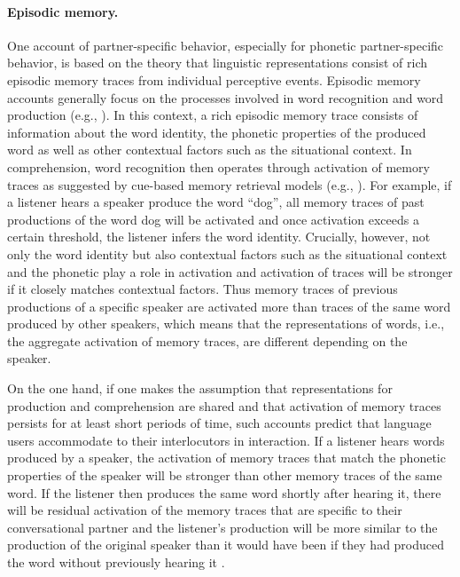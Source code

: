 \paragraph{Episodic memory.} One account of partner-specific behavior, especially for phonetic partner-specific behavior, is based
on the theory that linguistic representations consist of rich episodic memory traces from individual perceptive events. Episodic memory
accounts generally focus on the processes involved in word recognition and word production (e.g., \cite{Goldinger1998,Johnson1996,Pierrehumbert2001}).
In this context, a rich episodic memory trace consists of information about the word identity, the phonetic properties of the produced word as well as other contextual factors
such as the situational context. In comprehension, word recognition then operates through
activation of memory traces as suggested by cue-based memory retrieval models (e.g., \cite{Ratcliff1979}). For example, if a listener hears a speaker produce 
the word ``dog'', all memory traces of past productions of the word
dog will be activated and once activation exceeds a certain threshold, the listener infers the word identity. Crucially, however, not only the word identity
but also contextual factors such as the situational context and the phonetic play a role in activation and activation of traces will be stronger if it closely matches
contextual factors. Thus memory traces of previous productions of a specific speaker are activated more than traces of the same word produced by other speakers,
which means that the representations of words, i.e., the aggregate activation of memory traces, are different depending on the speaker.

On the one hand, if one makes the assumption that representations for production and comprehension are shared and that activation of memory traces persists for at least
short periods of time, such accounts predict that language users
accommodate to their interlocutors in interaction. If a listener hears words produced by a speaker, the activation of memory traces that match the phonetic properties of the speaker
will be stronger than other memory traces of the same word. If the listener then produces the same word shortly after hearing it, there will be residual activation of the memory 
traces that are specific to their conversational partner and the listener's production will be more similar to the production of the original speaker than it would have been if they had
produced the word without previously hearing it \cite{Goldinger1998}.

